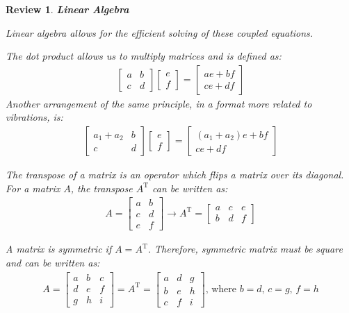 \documentclass[12pt,letter]{article}
\numberwithin{ex}{section} %
\newtheorem{re}{Review}
\numberwithin{re}{section} %
\newenvironment{review}{\begin{mdframed}[middlelinewidth=2mm,roundcorner=20pt]\begin{re}\normalfont}{\end{re}\end{mdframed}}
\begin{document}
\begin{review}
\textbf{Linear Algebra}

Linear algebra allows for the efficient solving of these coupled equations. 

The dot product allows us to multiply matrices and is defined as:
\begin{eqnarray}
  \begin{bmatrix} a & b \\ c & d \end{bmatrix}\begin{bmatrix} e \\  f \end{bmatrix} = \begin{bmatrix} ae+bf \\ ce + df \end{bmatrix}
\end{eqnarray}
Another arrangement of the same principle, in a format more related to vibrations, is:
\begin{eqnarray}
  \begin{bmatrix} a_1+a_2 & b \\ c & d \end{bmatrix}\begin{bmatrix} e \\  f \end{bmatrix} = \begin{bmatrix} (a_1+a_2)e+bf \\ ce + df \end{bmatrix}
\end{eqnarray}

The transpose of a matrix is an  operator which flips a matrix over its diagonal. For a matrix $A$, the transpose $A^\text{T}$ can be written as:
\begin{eqnarray}
   A = \begin{bmatrix} a & b \\ c & d \\ e & f\end{bmatrix} \rightarrow A^\text{T} = \begin{bmatrix} a & c & e \\  b & d & f \end{bmatrix}
\end{eqnarray}

A matrix is symmetric if $A =A^\text{T}$. Therefore, symmetric matrix must be square and can be written as:
\begin{eqnarray}
   A = \begin{bmatrix} a & b &c \\ d & e & f\\ g & h & i \end{bmatrix} = A^\text{T} = \begin{bmatrix} a & d & g \\ b & e & h \\ c & f & i \end{bmatrix}\text{, where } b=d \text{, }c=g\text{, }f=h
\end{eqnarray}


\end{review}
\end{document}
